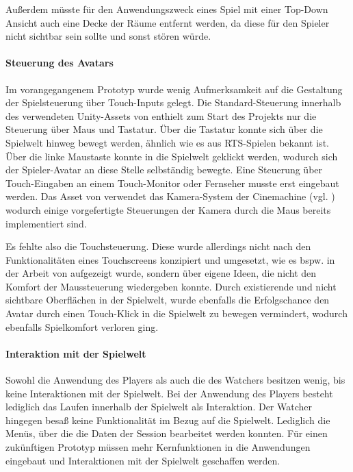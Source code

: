 Außerdem müsste für den Anwendungszweck eines Spiel mit einer Top-Down Ansicht auch eine Decke der Räume entfernt werden, da diese für den Spieler nicht sichtbar sein sollte und sonst stören würde.


\paragraph{Steuerung des Avatars}
Im vorangegangenem Prototyp wurde wenig Aufmerksamkeit auf die Gestaltung der Spielsteuerung über Touch-Inputs gelegt. Die Standard-Steuerung innerhalb des verwendeten Unity-Assets von \cite{alasl_autolevel_nodate} enthielt zum Start des Projekts nur die Steuerung über Maus und Tastatur. Über die Tastatur konnte sich über die Spielwelt hinweg bewegt werden, ähnlich wie es aus \ac{RTS}-Spielen bekannt ist. Über die linke Maustaste konnte in die Spielwelt geklickt werden, wodurch sich der Spieler-Avatar an diese Stelle selbständig bewegte. Eine Steuerung über Touch-Eingaben an einem Touch-Monitor oder Fernseher musste erst eingebaut werden. Das Asset von \cite{alasl_autolevel_nodate} verwendet das Kamera-System der Cinemachine (vgl. \cite{noauthor_about_nodate}) wodurch einige vorgefertigte Steuerungen der Kamera durch die Maus bereits implementiert sind. 

Es fehlte also die Touchsteuerung. Diese wurde allerdings nicht nach den Funktionalitäten eines Touchscreens konzipiert und umgesetzt, wie es bspw. in der Arbeit von \cite[S. 64ff]{reinhard_augmented_2022} aufgezeigt wurde, sondern über eigene Ideen, die nicht den Komfort der Maussteuerung wiedergeben konnte. Durch existierende und nicht sichtbare Oberflächen in der Spielwelt, wurde ebenfalls die Erfolgschance den Avatar durch einen Touch-Klick in die Spielwelt zu bewegen vermindert, wodurch ebenfalls Spielkomfort verloren ging.


\paragraph{Interaktion mit der Spielwelt}
Sowohl die Anwendung des Players als auch die des Watchers besitzen wenig, bis keine Interaktionen mit der Spielwelt. Bei der Anwendung des Players besteht lediglich das Laufen innerhalb der Spielwelt als Interaktion. Der Watcher hingegen besaß keine Funktionalität im Bezug auf die Spielwelt. Lediglich die Menüs, über die die Daten der Session bearbeitet werden konnten. Für einen zukünftigen Prototyp müssen mehr Kernfunktionen in die Anwendungen eingebaut und Interaktionen mit der Spielwelt geschaffen werden.

